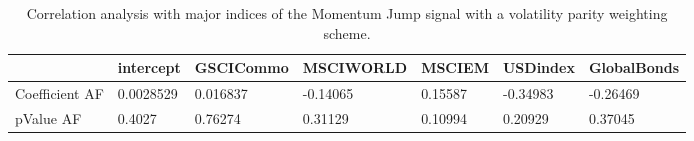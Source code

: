 \begin{table}[H]
\centering
\begin{tabular}{lllllll}
& intercept & GSCICommo & MSCIWORLD & MSCIEM & USDindex & GlobalBonds \\ 
\hline 
Coefficient AF & 0.0028529 & 0.016837 & -0.14065 & 0.15587 & -0.34983 & -0.26469 \\ 
pValue AF & 0.4027 & 0.76274 & 0.31129 & 0.10994 & 0.20929 & 0.37045 \\ 
\hline
\end{tabular}
\caption{Correlation analysis with major indices of the Momentum Jump signal with a volatility parity weighting scheme.}
\label{MOMJUMPVP_AFACTOR}
\end{table}
